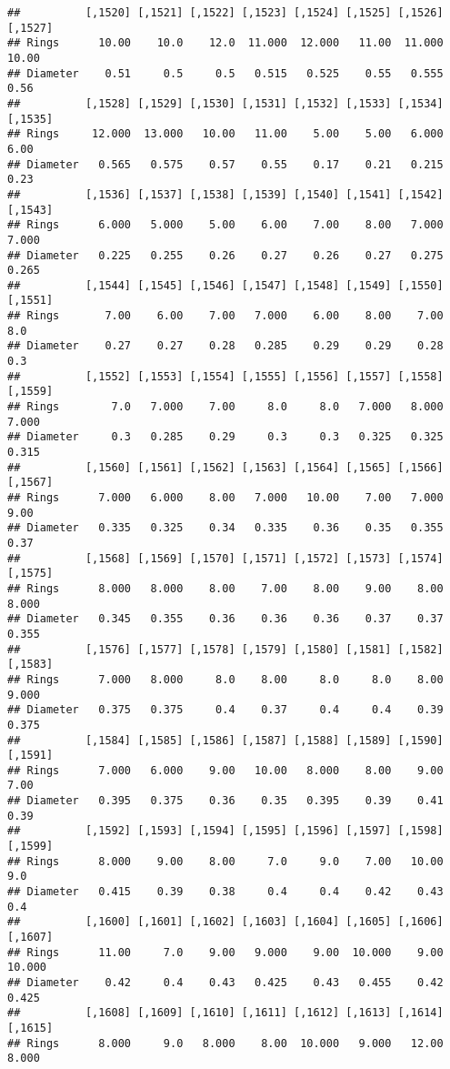 \documentclass[
]{article}
\begin{document}
\begin{verbatim}
##          [,1520] [,1521] [,1522] [,1523] [,1524] [,1525] [,1526] [,1527]
## Rings      10.00    10.0    12.0  11.000  12.000   11.00  11.000   10.00
## Diameter    0.51     0.5     0.5   0.515   0.525    0.55   0.555    0.56
##          [,1528] [,1529] [,1530] [,1531] [,1532] [,1533] [,1534] [,1535]
## Rings     12.000  13.000   10.00   11.00    5.00    5.00   6.000    6.00
## Diameter   0.565   0.575    0.57    0.55    0.17    0.21   0.215    0.23
##          [,1536] [,1537] [,1538] [,1539] [,1540] [,1541] [,1542] [,1543]
## Rings      6.000   5.000    5.00    6.00    7.00    8.00   7.000   7.000
## Diameter   0.225   0.255    0.26    0.27    0.26    0.27   0.275   0.265
##          [,1544] [,1545] [,1546] [,1547] [,1548] [,1549] [,1550] [,1551]
## Rings       7.00    6.00    7.00   7.000    6.00    8.00    7.00     8.0
## Diameter    0.27    0.27    0.28   0.285    0.29    0.29    0.28     0.3
##          [,1552] [,1553] [,1554] [,1555] [,1556] [,1557] [,1558] [,1559]
## Rings        7.0   7.000    7.00     8.0     8.0   7.000   8.000   7.000
## Diameter     0.3   0.285    0.29     0.3     0.3   0.325   0.325   0.315
##          [,1560] [,1561] [,1562] [,1563] [,1564] [,1565] [,1566] [,1567]
## Rings      7.000   6.000    8.00   7.000   10.00    7.00   7.000    9.00
## Diameter   0.335   0.325    0.34   0.335    0.36    0.35   0.355    0.37
##          [,1568] [,1569] [,1570] [,1571] [,1572] [,1573] [,1574] [,1575]
## Rings      8.000   8.000    8.00    7.00    8.00    9.00    8.00   8.000
## Diameter   0.345   0.355    0.36    0.36    0.36    0.37    0.37   0.355
##          [,1576] [,1577] [,1578] [,1579] [,1580] [,1581] [,1582] [,1583]
## Rings      7.000   8.000     8.0    8.00     8.0     8.0    8.00   9.000
## Diameter   0.375   0.375     0.4    0.37     0.4     0.4    0.39   0.375
##          [,1584] [,1585] [,1586] [,1587] [,1588] [,1589] [,1590] [,1591]
## Rings      7.000   6.000    9.00   10.00   8.000    8.00    9.00    7.00
## Diameter   0.395   0.375    0.36    0.35   0.395    0.39    0.41    0.39
##          [,1592] [,1593] [,1594] [,1595] [,1596] [,1597] [,1598] [,1599]
## Rings      8.000    9.00    8.00     7.0     9.0    7.00   10.00     9.0
## Diameter   0.415    0.39    0.38     0.4     0.4    0.42    0.43     0.4
##          [,1600] [,1601] [,1602] [,1603] [,1604] [,1605] [,1606] [,1607]
## Rings      11.00     7.0    9.00   9.000    9.00  10.000    9.00  10.000
## Diameter    0.42     0.4    0.43   0.425    0.43   0.455    0.42   0.425
##          [,1608] [,1609] [,1610] [,1611] [,1612] [,1613] [,1614] [,1615]
## Rings      8.000     9.0   8.000    8.00  10.000   9.000   12.00   8.000

\end{verbatim}
\end{document}
